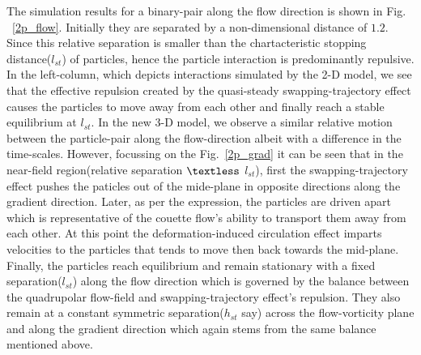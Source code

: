The simulation results for a binary-pair along the flow direction is shown in Fig. ~\ref{2p_flow}. Initially they are separated by a non-dimensional distance of $1.2$. Since this relative separation is smaller than the chartacteristic stopping distance($l_{st}$) of particles, hence the particle interaction is predominantly repulsive. In the left-column, which depicts interactions simulated by the 2-D model, we see that the effective repulsion created by the quasi-steady swapping-trajectory effect causes the particles to move away from each other and finally reach a stable equilibrium at $l_{st}$. In the new 3-D model, we observe a similar relative motion between the particle-pair along the flow-direction albeit with a difference in the time-scales. However, focussing on the Fig.~\ref{2p_grad} it can be seen that in the near-field region(relative separation $\textless$  $l_{st}$), first the swapping-trajectory effect pushes the paticles out of the mide-plane in opposite directions along the gradient direction. Later, as per the expression, the particles are driven apart which is representative of the couette flow's ability to transport them away from each other. At this point the deformation-induced circulation effect imparts velocities to the particles that tends to move then back towards the mid-plane. Finally, the particles reach equilibrium and remain stationary with a fixed separation($l_{st}$) along the flow direction which is governed by the balance between the quadrupolar flow-field and swapping-trajectory effect's repulsion. They also remain at a constant symmetric separation($h_{st}$ say) across the flow-vorticity plane and along the gradient direction which again stems from the same balance mentioned above.

